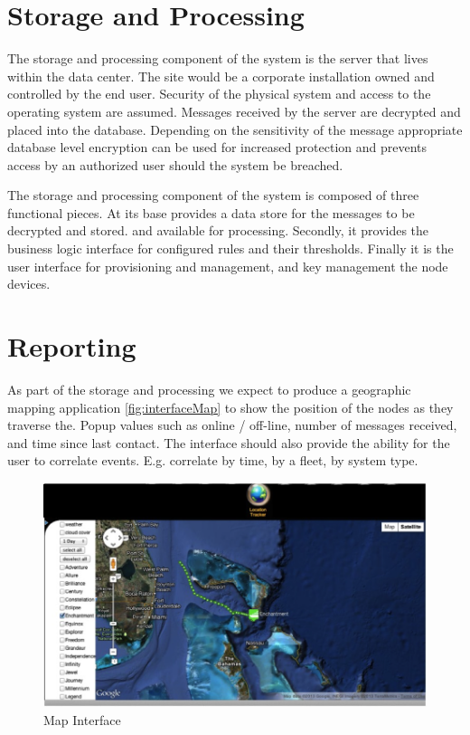 \section{Storage and Processing}
The storage and processing component of the system is the server that lives within the data center. The site would be a corporate installation owned and controlled by the end user. Security of the physical system and access to the operating system are assumed.  Messages received by the server are decrypted and placed into the database. Depending on the sensitivity of the message appropriate database level encryption can be used for increased protection and prevents access by an authorized user should the system be breached. 

The storage and processing component of the system is composed of three functional pieces. At its base provides a data store for the messages to be decrypted and stored. and available for processing. Secondly, it provides the business logic interface for configured rules and their thresholds. Finally it is the user interface for provisioning and management, and key management the node devices. 

\section{Reporting}
As part of the storage and processing we expect to produce a geographic mapping application \autoref{fig:interfaceMap} to show the position of the nodes as they traverse the. 
Popup values such as online / off-line, number of messages received, and time since last contact. The interface should also provide the ability for the user to correlate events. E.g. correlate by time, by a fleet, by system type. 

\begin{figure}
\centering
\includegraphics[scale=.9]{Figures/interfaceMap}
\caption{Map Interface}
\label{fig:interfaceMap}
\end{figure}

